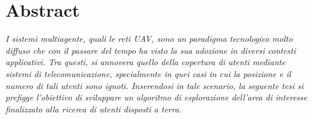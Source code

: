 \section*{Abstract} \label{sec:asbtract}
\textit{
I sistemi multiagente, quali le reti UAV, sono un paradigma tecnologico molto diffuso che con il passare del tempo ha visto la sua adozione in diversi contesti applicativi.
Tra questi, si annovera quello della copertura di utenti mediante sistemi di telecomunicazione, specialmente in quei casi in cui la posizione e il numero di tali utenti sono ignoti.
Inserendosi in tale scenario, la seguente tesi si prefigge l'obiettivo di sviluppare un algoritmo di esplorazione dell'area di interesse finalizzato alla ricerca di utenti disposti a terra.
}